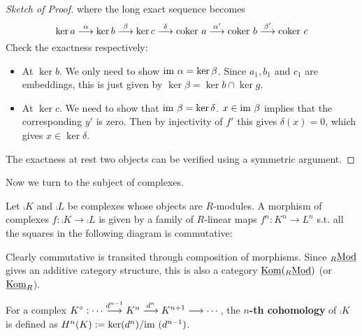 \begin{proof}[Sketch of Proof]
    where the long exact sequence becomes
    \[
        \ker a \overset{\alpha}{\longrightarrow} \ker b \overset{\beta}{\longrightarrow} \ker c \overset{\delta}{\longrightarrow} \mathrm{coker}\  a \overset{\alpha'}{\longrightarrow} \mathrm{coker}\  b \overset{\beta'}{\longrightarrow} \mathrm{coker}\  c
    \]
    Check the exactness respectively:
    \begin{itemize}
        \item At $\ker b$. We only need to show $\mathrm{im}\  \alpha = \ker \beta$. Since $a_1, b_1$ and $c_1$ are embeddings, this is just given by $\ker \beta = \ker b \cap \ker g$. 
        \item At $\ker c$. We need to show that $\mathrm{im}\  \beta = \ker \delta $. $x \in \mathrm{im}\  \beta$ implies that the corresponding $y'$ is zero. Then by injectivity of $f'$ this gives $\delta(x) = 0$, which gives $x \in \ker \delta$.
    \end{itemize}
    The exactness at rest two objects can be verified using a symmetric argument. 
\end{proof}

Now we turn to the subject of complexes.

\begin{definition}
    Let $\comp{K}$ and $\comp{L}$ be complexes whose objects are $R$-modules. A morphism of complexes $f: \comp{K} \to \comp{L}$ is given by a family of $R$-linear maps $f^n: K^n \to L^n$ s.t. all the squares in the following diagram is commutative:
    \begin{figure}
        \centering
    \end{figure}
\end{definition}

\begin{remark}
    Clearly commutative is transited through composition of morphisms. Since ${}_{R}\underline{\textup{Mod}}$ gives an additive category structure, this is also a category $\underline{\mathrm{Kom}}({}_{R}\underline{\textup{Mod}})$ (or $\underline{\mathrm{Kom}}_R$).
\end{remark}

\begin{definition}[Cohomology]
    For a complex $K^{\circ}: \cdots \overset{d^{n-1}}{\longrightarrow} K^n \overset{d^n}{\longrightarrow} K^{n+1} \longrightarrow \cdots$, the \textbf{$n$-th cohomology} of $\comp{K}$ is defined as $H^n(K) := \ker(d^n)/ \mathrm{im}\ (d^{n-1})$.
\end{definition}


